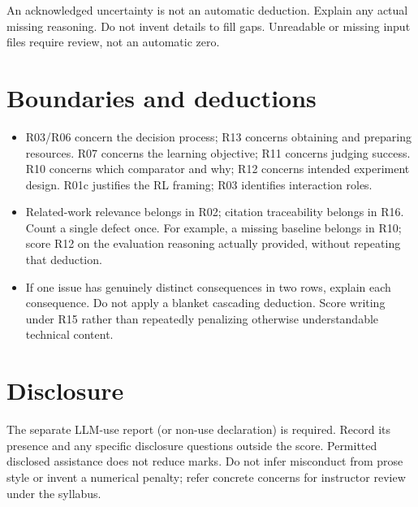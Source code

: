 \documentclass{article}
\begin{document}
An acknowledged uncertainty is not an automatic deduction. Explain any actual missing reasoning. Do not invent details to fill gaps. Unreadable or missing input files require review, not an automatic zero.

\section*{Boundaries and deductions}
\begin{itemize}
\item R03/R06 concern the decision process; R13 concerns obtaining and preparing resources. R07 concerns the learning objective; R11 concerns judging success. R10 concerns which comparator and why; R12 concerns intended experiment design. R01c justifies the RL framing; R03 identifies interaction roles.
\item Related-work relevance belongs in R02; citation traceability belongs in R16. Count a single defect once. For example, a missing baseline belongs in R10; score R12 on the evaluation reasoning actually provided, without repeating that deduction.
\item If one issue has genuinely distinct consequences in two rows, explain each consequence. Do not apply a blanket cascading deduction. Score writing under R15 rather than repeatedly penalizing otherwise understandable technical content.
\end{itemize}

\section*{Disclosure}
The separate LLM-use report (or non-use declaration) is required. Record its presence and any specific disclosure questions outside the score. Permitted disclosed assistance does not reduce marks. Do not infer misconduct from prose style or invent a numerical penalty; refer concrete concerns for instructor review under the syllabus.

\newpage
\end{document}
